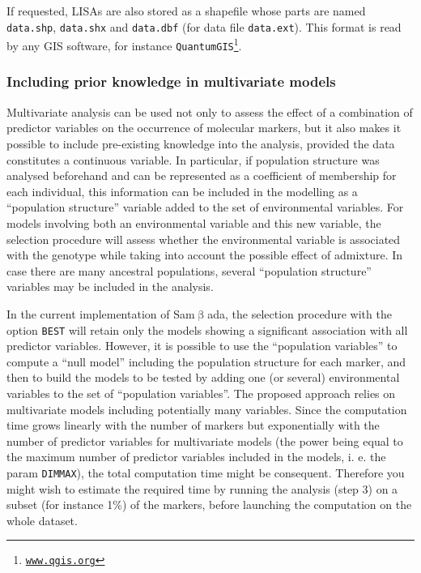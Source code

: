 \documentclass[a4paper,11pt]{article}
\newcommand{\smb}{\textsf{Sam$\upbeta$ada}}
\newcommand{\prog}[1]{\texttt{#1}}
\begin{document}
If requested, LISAs are also stored as a shapefile whose parts are named \prog{data.shp}, \prog{data.shx} and \prog{data.dbf} (for data file \prog{data.ext}).
This format is read by any GIS software, for instance \prog{QuantumGIS\footnote{\url{www.qgis.org}}}.


\subsubsection{Including prior knowledge in multivariate models\label{sec:prior-knowledge}}
Multivariate analysis can be used not only to assess the effect of a combination of predictor variables on the occurrence of molecular markers, but it also makes it possible to include pre-existing knowledge into the analysis, provided the data constitutes a continuous variable. 
In particular, if population structure was analysed beforehand and can be represented as a coefficient of membership for each individual, this information can be included in the modelling as a  \enquote{population structure} variable added to the set of environmental variables.
For models involving both an environmental variable and this new variable, the selection procedure will assess whether the environmental variable is associated with the genotype while taking into account the possible effect of admixture.
In case there are many ancestral populations, several \enquote{population structure} variables may be included in the analysis.

In the current implementation of \smb, the selection procedure with the option \prog{BEST} will retain only the models showing a significant association with all predictor variables.
However, it is possible to use the \enquote{population variables} to compute a \enquote{null model} including the population structure for each marker, and then to build the models to be tested by adding one (or several) environmental variables to the set of \enquote{population variables}.
The proposed approach relies on multivariate models including potentially many variables.
Since the computation time grows linearly with the number of markers but exponentially with the number of predictor variables for multivariate models (the power being equal to the maximum number of predictor variables included in the models, i. e. the param \texttt{DIMMAX}), the total computation time might be consequent.
Therefore you might wish to estimate the required time by running the analysis (step 3) on a subset (for instance 1\%) of the markers, before launching the computation on the whole dataset.
\end{document}
